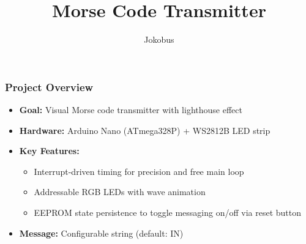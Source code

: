 \documentclass[aspectratio=169, 8pt]{beamer}
\title{Morse Code Transmitter}
\author{Jokobus}
\begin{document}
	

\begin{frame}
		\titlepage
	\end{frame}

	\begin{frame}[fragile,shrink=10]
		\frametitle{Project Overview}
		\begin{itemize}
			\item \textbf{Goal:} Visual Morse code transmitter with lighthouse effect
			\item \textbf{Hardware:} Arduino Nano (ATmega328P) + WS2812B LED strip
			\item \textbf{Key Features:}
			\begin{itemize}
				\item Interrupt-driven timing for precision and free main loop
				\item Addressable RGB LEDs with wave animation
				\item EEPROM state persistence to toggle messaging on/off via reset button
			\end{itemize}
			\item \textbf{Message:} Configurable string (default: \glqq IN\grqq)
		\end{itemize}
	\end{frame}
		
\end{document}
